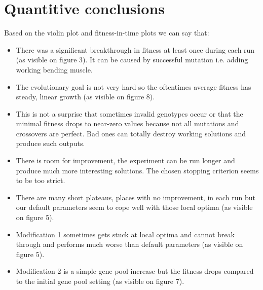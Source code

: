 \documentclass[a4]{article}
\begin{document}
\section{Quantitive conclusions}
Based on the violin plot and fitness-in-time plots we can say that:
\begin{itemize}
	\item There was a significant breakthrough in fitness at least once during each run (as visible on figure 3). It can be caused by successful mutation i.e. adding working bending muscle.
	\item The evolutionary goal is not very hard so the oftentimes average fitness has steady, linear growth (as visible on figure 8).
	\item This is not a surprise that sometimes invalid genotypes occur or that the minimal fitness drops to near-zero values because not all mutations and crossovers are perfect. Bad ones can totally destroy working solutions and produce such outputs.
	\item There is room for improvement, the experiment can be run longer and produce much more interesting solutions. The chosen stopping criterion seems to be too strict.
	\item There are many short plateaus, places with no improvement, in each run but our default parameters seem to cope well with those local optima (as visible on figure 5). 
	\item Modification 1 sometimes gets stuck at local optima and cannot break through and performs much worse than default parameters (as visible on figure 5).
	\item Modification 2 is a simple gene pool increase but the fitness drops compared to the initial gene pool setting (as visible on figure 7).
\end{itemize} 
\end{document}
